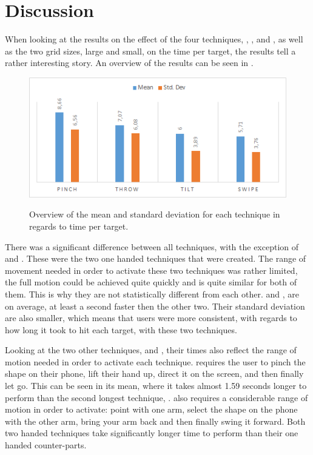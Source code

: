 \section{Discussion}
\label{sec:discussion}

When looking at the results on the effect of the four techniques, \pinch, \tilt, \swipe and \throw, as well as the two grid sizes, large and small, on the time per target, the results tell a rather interesting story. An overview of the results can be seen in .

\begin{figure}[H]
	{\includegraphics[width = 1\columnwidth ]{images/timeResults.png}} 
	\caption{
		Overview of the mean and standard deviation for each technique in regards to time per target.
	}
	\label{fig:timeResults}
\end{figure}

There was a significant difference between all techniques, with the exception of \swipe and \tilt. These were the two one handed techniques that were created. The range of movement needed in order to activate these two techniques was rather limited, the full motion could be achieved quite quickly and is quite similar for both of them.  This is why they are not statistically different from each other. \swipe and \tilt, are on average, at least a second faster then the other two. Their standard deviation are also smaller, which means that users were more consistent, with regards to how long it took to hit each target, with these two techniques. 

Looking at the two other techniques, \pinch and \throw, their times also reflect the range of motion needed in order to activate each technique. \pinch requires the user to pinch the shape on their phone, lift their hand up, direct it on the screen, and then finally let go. This can be seen in its mean, where it takes almost 1.59 seconds longer to perform than the second longest technique, \throw. \throw also requires a considerable range of motion in order to activate: point with one arm, select the shape on the phone with the other arm, bring your arm back and then finally swing it forward. Both two handed techniques take significantly longer time to perform than their one handed counter-parts.


